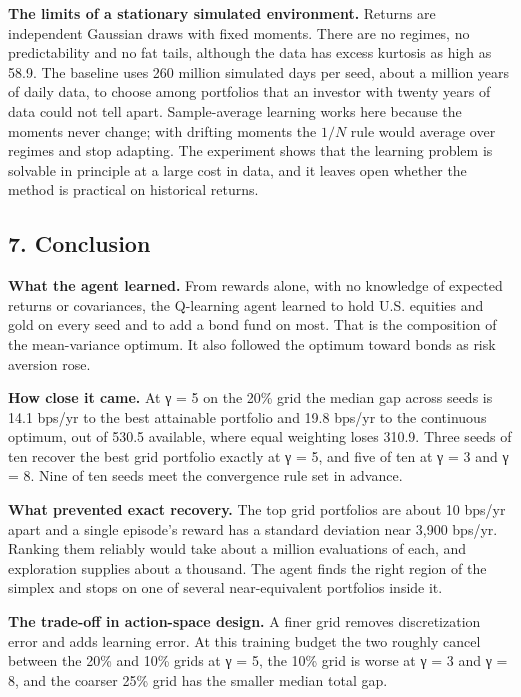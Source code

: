 \documentclass[
  11pt]{article}
\begin{document}
\textbf{The limits of a stationary simulated environment.} Returns are
independent Gaussian draws with fixed moments. There are no regimes, no
predictability and no fat tails, although the data has excess kurtosis
as high as 58.9. The baseline uses 260 million simulated days per seed,
about a million years of daily data, to choose among portfolios that an
investor with twenty years of data could not tell apart. Sample-average
learning works here because the moments never change; with drifting
moments the \(1/N\) rule would average over regimes and stop adapting.
The experiment shows that the learning problem is solvable in principle
at a large cost in data, and it leaves open whether the method is
practical on historical returns.

\subsection{7. Conclusion}\label{conclusion}

\textbf{What the agent learned.} From rewards alone, with no knowledge
of expected returns or covariances, the Q-learning agent learned to hold
U.S. equities and gold on every seed and to add a bond fund on most.
That is the composition of the mean-variance optimum. It also followed
the optimum toward bonds as risk aversion rose.

\textbf{How close it came.} At γ = 5 on the 20\% grid the median gap
across seeds is 14.1 bps/yr to the best attainable portfolio and 19.8
bps/yr to the continuous optimum, out of 530.5 available, where equal
weighting loses 310.9. Three seeds of ten recover the best grid
portfolio exactly at γ = 5, and five of ten at γ = 3 and γ = 8. Nine of
ten seeds meet the convergence rule set in advance.

\textbf{What prevented exact recovery.} The top grid portfolios are
about 10 bps/yr apart and a single episode's reward has a standard
deviation near 3,900 bps/yr. Ranking them reliably would take about a
million evaluations of each, and exploration supplies about a thousand.
The agent finds the right region of the simplex and stops on one of
several near-equivalent portfolios inside it.

\textbf{The trade-off in action-space design.} A finer grid removes
discretization error and adds learning error. At this training budget
the two roughly cancel between the 20\% and 10\% grids at γ = 5, the
10\% grid is worse at γ = 3 and γ = 8, and the coarser 25\% grid has the
smaller median total gap.
\end{document}
